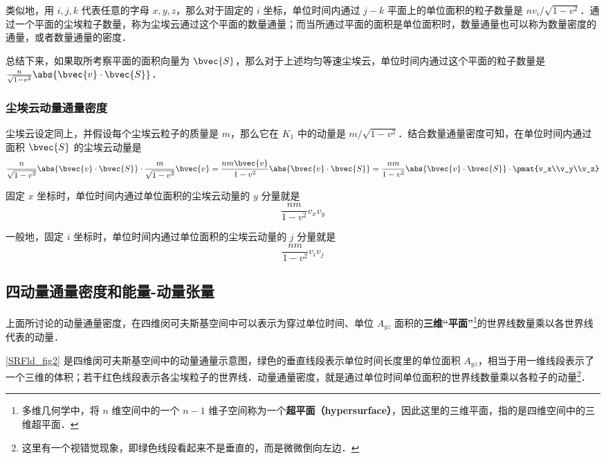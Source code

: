 类似地，用 $i, j, k$ 代表任意的字母 $x, y, z$，那么对于固定的 $i$ 坐标，单位时间内通过 $j-k$ 平面上的单位面积的粒子数量是 $nv_i/\sqrt{1-v^2}$．通过一个平面的尘埃粒子数量，称为尘埃云通过这个平面的数量通量；而当所通过平面的面积是单位面积时，数量通量也可以称为数量密度的通量，或者数量通量的密度．

总结下来，如果取所考察平面的面积向量为 $\bvec{S}$，那么对于上述均匀等速尘埃云，单位时间内通过这个平面的粒子数量是 $\frac{n}{\sqrt{1-v^2}}\abs{\bvec{v}\cdot\bvec{S}}$．

\subsubsection{尘埃云动量通量密度}

尘埃云设定同上，并假设每个尘埃云粒子的质量是 $m$，那么它在 $K_1$ 中的动量是 $m/\sqrt{1-v^2}$．结合数量通量密度可知，在单位时间内通过面积 $\bvec{S}$ 的尘埃云动量是
\begin{equation}
\frac{n}{\sqrt{1-v^2}}\abs{\bvec{v}\cdot\bvec{S}}\cdot\frac{m}{\sqrt{1-v^2}}\bvec{v}=\frac{nm\bvec{v}}{1-v^2}\abs{\bvec{v}\cdot\bvec{S}}=\frac{nm}{1-v^2}\abs{\bvec{v}\cdot\bvec{S}}\cdot\pmat{v_x\\v_y\\v_z}
\end{equation}

固定 $x$ 坐标时，单位时间内通过单位面积的尘埃云动量的 $y$ 分量就是
\begin{equation}
\frac{nm}{1-v^2}v_xv_y
\end{equation}

一般地，固定 $i$ 坐标时，单位时间内通过单位面积的尘埃云动量的 $j$ 分量就是
\begin{equation}\label{SRFld_eq1}
\frac{nm}{1-v^2}v_iv_j
\end{equation}

\subsection{四动量通量密度和能量-动量张量}

上面所讨论的动量通量密度，在四维闵可夫斯基空间中可以表示为穿过单位时间、单位 $A_{yz}$ 面积的\textbf{三维“平面”}\footnote{多维几何学中，将 $n$ 维空间中的一个 $n-1$ 维子空间称为一个\textbf{超平面（hypersurface）}，因此这里的三维平面，指的是四维空间中的三维超平面．}的世界线数量乘以各世界线代表的动量．

\autoref{SRFld_fig2} 是四维闵可夫斯基空间中的动量通量示意图，绿色的垂直线段表示单位时间长度里的单位面积 $A_{yz}$，相当于用一维线段表示了一个三维的体积；若干红色线段表示各尘埃粒子的世界线．动量通量密度，就是通过单位时间单位面积的世界线数量乘以各粒子的动量\footnote{这里有一个视错觉现象，即绿色线段看起来不是垂直的，而是微微倒向左边．}．

